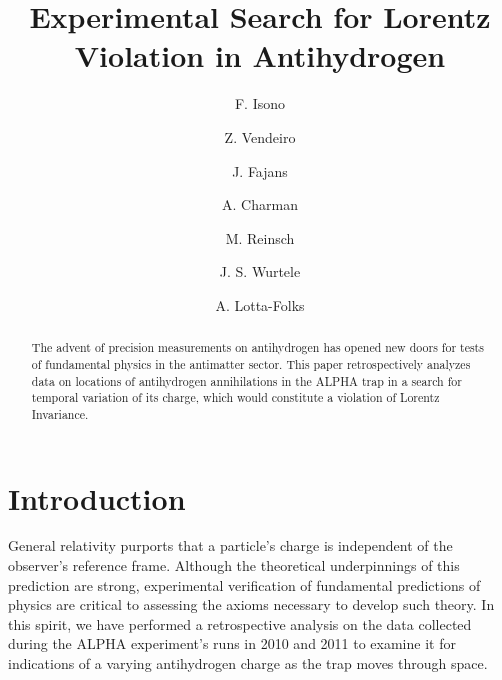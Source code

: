 \documentclass[superscriptaddress,aps,prb,11pt]{revtex4-1}
\begin{document}
\title{Experimental Search for Lorentz Violation in Antihydrogen}
\author{F. Isono}

\author{Z. Vendeiro}

\author{J. Fajans}

\author{A. Charman}

\author{M. Reinsch}

\author{J. S. Wurtele}

\author{A. Lotta-Folks}

\begin{abstract}
The advent of precision measurements on antihydrogen has opened new doors for tests of fundamental physics in the antimatter sector.  This paper retrospectively analyzes data on locations of antihydrogen annihilations in the ALPHA trap in a search for temporal variation of its charge, which would constitute a violation of Lorentz Invariance.
\end{abstract}

\maketitle

\section{Introduction}
General relativity purports that a particle's charge is independent of the observer's reference frame.  Although the theoretical underpinnings of this prediction are strong, experimental verification of fundamental predictions of physics are critical to assessing the axioms necessary to develop such theory.  In this spirit, we have performed a retrospective analysis on the data collected during the ALPHA experiment's runs in 2010 and 2011 to examine it for indications of a varying antihydrogen charge as the trap moves through space.
\end{document}
